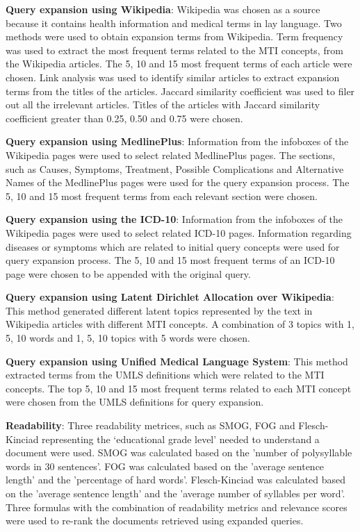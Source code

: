 \documentclass[]{article}
\begin{document}
\textbf{Query expansion using Wikipedia}: Wikipedia was chosen as a source because it contains health information and medical terms in lay language. Two methods were used to obtain expansion terms from Wikipedia. Term frequency was used to extract the most frequent terms related to the MTI concepts, from the Wikipedia articles. The 5, 10 and 15 most frequent terms of each article were chosen. Link analysis was used to identify similar articles to extract expansion terms from the titles of the articles. Jaccard similarity coefficient was used to filer out all the irrelevant articles. Titles of the articles with Jaccard similarity coefficient greater than 0.25, 0.50 and 0.75 were chosen.              

\textbf{Query expansion using MedlinePlus}: Information from the infoboxes of the Wikipedia pages were used to select related MedlinePlus pages. The sections, such as Causes, Symptoms, Treatment, Possible Complications and Alternative Names of the MedlinePlus pages were used for the query expansion process. The 5, 10 and 15 most frequent terms from each relevant section were chosen.       

\textbf{Query expansion using the ICD-10}: Information from the infoboxes of the Wikipedia pages were used to select related ICD-10 pages. Information regarding diseases or symptoms which are related to initial query concepts were used for query expansion process. The 5, 10 and 15 most frequent terms of an ICD-10 page were chosen to be appended with the original query.      

\textbf{Query expansion using Latent Dirichlet Allocation over Wikipedia}: This method generated different latent topics represented by the text in Wikipedia articles with different MTI concepts. A combination of 3 topics with 1, 5, 10 words and 1, 5, 10 topics with 5 words were chosen.     

\textbf{Query expansion using Unified Medical Language System}: This method extracted terms from the UMLS definitions which were related to the MTI concepts. The top 5, 10 and 15 most frequent terms related to each MTI concept were chosen from the UMLS definitions for query expansion.  

\textbf{Readability}: Three readability metrices, such as SMOG, FOG and Flesch-Kinciad representing the ‘educational grade level’ needed to understand a document were used. SMOG was calculated based on the 'number of polysyllable words in 30 sentences'. FOG was calculated based on the 'average sentence length' and the 'percentage of hard words'. Flesch-Kinciad was calculated based on the 'average sentence length' and the 'average number of syllables per word'. Three formulas with the combination of readability metrics and relevance scores were used to re-rank the documents retrieved using expanded queries. 
\end{document}
